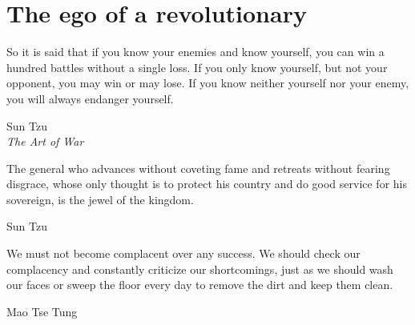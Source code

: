   \chapter{The ego of a revolutionary}    
  	\epigraph{So it is said that if you know your enemies and know yourself, you can win a hundred battles without a single loss.
If you only know yourself, but not your opponent, you may win or may lose.
If you know neither yourself nor your enemy, you will always endanger yourself.}{Sun Tzu\\ \textit{The Art of War}}
    \epigraph{The general who advances without coveting fame and retreats without fearing disgrace, whose only thought is to protect his country and do good service for his sovereign, is the jewel of the kingdom.}{Sun Tzu}
    \epigraph{We must not become complacent over any success. We should check our complacency and constantly criticize our shortcomings, just as we should wash our faces or sweep the floor every day to remove the dirt and keep them clean.}{Mao Tse Tung}
